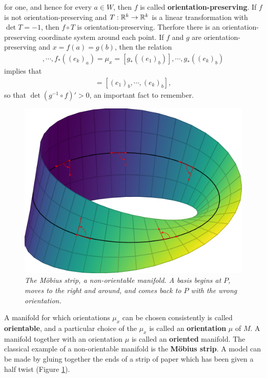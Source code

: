 for one, and hence for every $a\in W$, then $f$ is called \textbf{orientation-preserving}.
If $f$ is not orientation-preserving and $T:\mathbb{R}^k\to\mathbb{R}^k$ is a linear transformation with 
$\det T=-1$, then $f\circ T$ is orientation-preserving. Therfore there is an orientation-preserving
coordinate system around each point. If $f$ and $g$ are orientation-preserving and $x=f(a)=g(b)$, then 
the relation 
\begin{align*}
    [f_*((e_1)_a)], \cdots, f_*((e_k)_a) 
    = \mu_x
    = [g_*( (e_1)_b)], \cdots, g_*((e_k)_b)
\end{align*}
implies that 
\begin{align*}
    [(g^{-1}\circ f)_*((e_1)_a), \cdots, (g^{-1}\circ f)_*((e_k)_a)] 
    = [(e_1)_b, \cdots, (e_k)_b],
\end{align*}
so that $\det (g^{-1}\circ f)'>0$, an important fact to remember.

\begin{figure}[!htb]
    \centering
    \includegraphics[width=.75\linewidth]{./pics/Fig5-7.pdf}
    \caption{\textit{The M\"obius strip, a non-orientable manifold. A
    basis begins at $P$, moves to the right and around, and comes back to $P$ with
    the wrong orientation.}}
    \label{Fig 5-7}
\end{figure}

A manifold for which orientations $\mu_x$ can be chosen consistently is called \textbf{orientable}, 
and a particular choice of the $\mu_x$ is called an \textbf{orientation} $\mu$ of $M$.
A manifold together with an orientation $\mu$ is called an \textbf{oriented} manifold.
The classical example of a non-orientable manifold is the \textbf{M\"obius strip}.
A model can be made by gluing together the ends of a strip of
paper which has been given a half twist (Figure \ref{Fig 5-7}).

